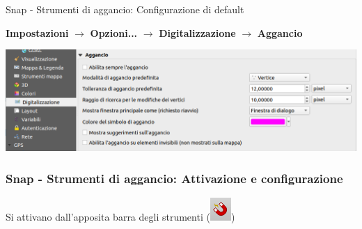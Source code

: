 \documentclass{beamer}
\begin{document}
{\begin{frame}{Snap - Strumenti di aggancio: Configurazione di default}
    \begin{center}
        \textbf{Impostazioni} $\rightarrow$ \textbf{Opzioni...} $\rightarrow$ \textbf{Digitalizzazione} $\rightarrow$ \textbf{Aggancio} 
	\end{center}
    \begin{center}
        \includegraphics[width=\textwidth]{digitizing_pics/Configurazione default snap del 2022-10-12 09-27-57.png}
    \end{center}
\end{frame}

\begin{frame}
    \frametitle{Snap - Strumenti di aggancio: Attivazione e configurazione}
    Si attivano dall'apposita barra degli strumenti (\includegraphics[width=.5 cm] {digitizing_pics/calamita.png})


\end{frame}}
\end{document}
